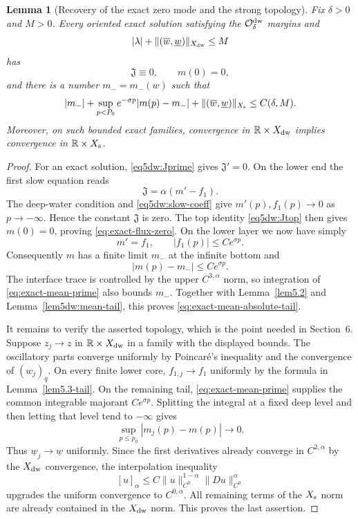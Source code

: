 \documentclass[11pt,reqno]{amsart}
\numberwithin{equation}{section}
\newtheorem{lemma}[theorem]{Lemma}
\theoremstyle{definition}
\theoremstyle{remark}
\begin{document}
\begin{lemma}[Recovery of the exact zero mode and the strong topology]
\label{lem5dw:exact-strong-recovery}
Fix $\delta>0$ and $M>0$.  Every oriented exact solution satisfying
the $\mathcal O_\delta^{\rm dw}$ margins and
\[
 |\lambda|+\|(\overline w,\underline w)\|_{X_{\rm dw}}\le M
\]
has
\begin{equation}\label{eq:exact-flux-zero}
 \mathfrak J\equiv0,\qquad m(0)=0,
\end{equation}
and there is a number $m_-=m_-(w)$ such that
\begin{equation}\label{eq:exact-mean-absolute-tail}
 |m_-|+\sup_{p<P_0}e^{-\sigma p}|m(p)-m_-|
 +\|(\overline w,\underline w)\|_{X_{\rm s}}
 \le C(\delta,M).
\end{equation}
Moreover, on such bounded exact families, convergence in
$\mathbb R\times X_{\rm dw}$ implies convergence in
$\mathbb R\times X_{\rm s}$.
\end{lemma}
\begin{proof}
For an exact solution, \eqref{eq5dw:Jprime} gives
$\mathfrak J'=0$.  On the lower end the first slow equation reads
\[
 \mathfrak J=\alpha(m'-f_1).
\]
The deep-water condition and \eqref{eq5dw:slow-coeff} give
$m'(p),f_1(p)\to0$ as $p\to-\infty$.  Hence the constant
$\mathfrak J$ is zero.  The top identity
\eqref{eq5dw:Jtop} then gives $m(0)=0$, proving
\eqref{eq:exact-flux-zero}.  On the lower layer we now have simply
\begin{equation}\label{eq:exact-mean-prime}
 m'=f_1,\qquad |f_1(p)|\le Ce^{\sigma p}.
\end{equation}
Consequently $m$ has a finite limit $m_-$ at the infinite bottom and
\[
 |m(p)-m_-|\le Ce^{\sigma p}.
\]
The interface trace is controlled by the upper $C^{3,\alpha}$ norm,
so integration of \eqref{eq:exact-mean-prime} also bounds $m_-$.
Together with Lemma~\ref{lem5.2} and
Lemma~\ref{lem5dw:mean-tail}, this proves
\eqref{eq:exact-mean-absolute-tail}.

It remains to verify the asserted topology, which is the point needed
in Section~6.  Suppose $z_j\to z$ in
$\mathbb R\times X_{\rm dw}$ in a family with the displayed bounds.
The oscillatory parts converge uniformly by Poincar\'e's inequality
and the convergence of $(w_j)_q$.  On every finite lower core,
$f_{1,j}\to f_1$ uniformly by the formula in
Lemma~\ref{lem5.3-tail}.  On the remaining tail,
\eqref{eq:exact-mean-prime} supplies the common integrable majorant
$Ce^{\sigma p}$.  Splitting the integral at a fixed deep level and
then letting that level tend to $-\infty$ gives
\[
 \sup_{p\le p_0}|m_j(p)-m(p)|\longrightarrow0.
\]
Thus $\underline w_j\to\underline w$ uniformly.  Since the first
derivatives already converge in $C^{2,\alpha}$ by the
$X_{\rm dw}$ convergence, the interpolation inequality
\[
 [u]_{\alpha}\le
 C\|u\|_{C^0}^{1-\alpha}\|Du\|_{C^0}^{\alpha}
\]
upgrades the uniform convergence to $C^{0,\alpha}$.  All remaining
terms of the $X_{\rm s}$ norm are already contained in the
$X_{\rm dw}$ norm.  This proves the last assertion.
\end{proof}
\end{document}
